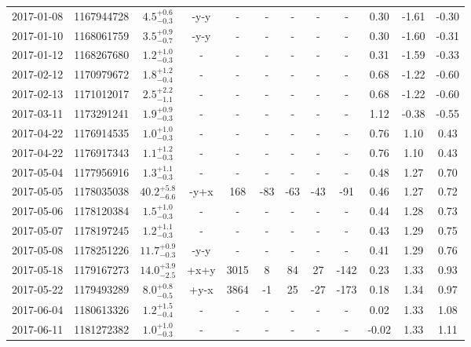 \begin{longtable*}{|c|c|c|c|c|c|c|c|c|c|c|c|}
	2017-01-08 & 1167944728 & $ 4.5^{+0.6}_{-0.3}$ & -y-y & - & - & - & - & - & 0.30 & -1.61 & -0.30 \\
	2017-01-10 & 1168061759 & $ 3.5^{+0.9}_{-0.7}$ & -y-y & - & - & - & - & - & 0.30 & -1.60 & -0.31 \\
	2017-01-12 & 1168267680 & $ 1.2^{+1.0}_{-0.3}$ & - & - & - & - & - & - & 0.31 & -1.59 & -0.33 \\
	2017-02-12 & 1170979672 & $ 1.8^{+1.2}_{-0.4}$ & - & - & - & - & - & - & 0.68 & -1.22 & -0.60 \\
	2017-02-13 & 1171012017 & $ 2.5^{+2.2}_{-1.1}$ & - & - & - & - & - & - & 0.68 & -1.22 & -0.60 \\
	2017-03-11 & 1173291241 & $ 1.9^{+0.9}_{-0.3}$ & - & - & - & - & - & - & 1.12 & -0.38 & -0.55 \\
	2017-04-22 & 1176914535 & $ 1.0^{+1.0}_{-0.3}$ & - & - & - & - & - & - & 0.76 & 1.10 & 0.43 \\
	2017-04-22 & 1176917343 & $ 1.1^{+1.2}_{-0.3}$ & - & - & - & - & - & - & 0.76 & 1.10 & 0.43 \\
	2017-05-04 & 1177956916 & $ 1.3^{+1.1}_{-0.3}$ & - & - & - & - & - & - & 0.48 & 1.27 & 0.70 \\
	2017-05-05 & 1178035038 & $40.2^{+5.8}_{-6.6}$ & -y+x & 168 & -83 & -63 & -43 & -91 & 0.46 & 1.27 & 0.72 \\
	2017-05-06 & 1178120384 & $ 1.5^{+1.0}_{-0.3}$ & - & - & - & - & - & - & 0.44 & 1.28 & 0.73 \\
	2017-05-07 & 1178197245 & $ 1.2^{+1.1}_{-0.3}$ & - & - & - & - & - & - & 0.43 & 1.29 & 0.75 \\
	2017-05-08 & 1178251226 & $11.7^{+0.9}_{-0.3}$ & -y-y & - & - & - & - & - & 0.41 & 1.29 & 0.76 \\
	2017-05-18 & 1179167273 & $14.0^{+3.9}_{-2.5}$ & +x+y & 3015 & 8 & 84 & 27 & -142 & 0.23 & 1.33 & 0.93 \\
	2017-05-22 & 1179493289 & $ 8.0^{+0.8}_{-0.5}$ & +y-x & 3864 & -1 & 25 & -27 & -173 & 0.18 & 1.34 & 0.97 \\
	2017-06-04 & 1180613326 & $ 1.2^{+1.5}_{-0.4}$ & - & - & - & - & - & - & 0.02 & 1.33 & 1.08 \\
	2017-06-11 & 1181272382 & $ 1.0^{+1.0}_{-0.3}$ & - & - & - & - & - & - & -0.02 & 1.33 & 1.11 \\
	\hline
\end{longtable*} 
\endgroup